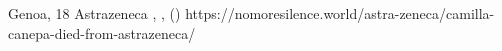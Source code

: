           {
            Genoa, 
          }
          {
            18
          }
          {
            Astrazeneca
          }
          {
          }
          {
            ,
            ,
             ()
          }
          {
            https://nomoresilence.world/astra-zeneca/camilla-canepa-died-from-astrazeneca/
          }
